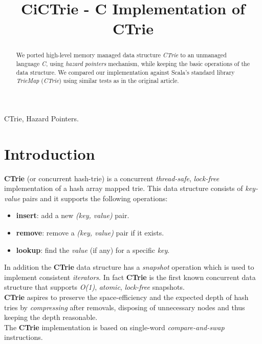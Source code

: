 \documentclass[conference]{IEEEtran}
\begin{document}
%
\title{CiCTrie - C Implementation of CTrie}

\author{
\and
{}
}

\maketitle


\begin{abstract}
	We ported high-level memory managed data structure \textit{CTrie} to an unmanaged language \textit{C}, using \textit{hazard pointers} mechanism, while keeping the basic operations of the data structure. We compared our implementation against Scala's standard library \textit{TrieMap} (\textit{CTrie}) using similar tests as in the original article.
\end{abstract}

\begin{IEEEkeywords}
	CTrie, Hazard Pointers.
\end{IEEEkeywords}

\IEEEpeerreviewmaketitle

\section{Introduction}
		\textbf{CTrie}\cite{article}\cite{wiki-ctrie} (or concurrent hash-trie) is a concurrent \textit{thread-safe}, \textit{lock-free} implementation of a hash array mapped trie. This data structure consists of \textit{key-value} pairs and it supports the following operations:
		\begin{itemize}
			\item \textbf{insert}: add a new \textit{(key, value)} pair.
			\item \textbf{remove}: remove a \textit{(key, value)} pair if it exists.
			\item \textbf{lookup}: find the \textit{value} (if any) for a specific \textit{key}. 
		\end{itemize}
		In addition the \textbf{CTrie} data structure has a \textit{snapshot} operation which is used to implement consistent \textit{iterators}. In fact \textbf{CTrie} is the first known concurrent data structure that supports \textit{O(1)}, \textit{atomic}, \textit{lock-free} snapshots.\\
		\textbf{CTrie} aspires to preserve the space-efficiency and the expected depth of hash tries by \textit{compressing} after removals, disposing of unnecessary nodes and thus keeping the depth reasonable.\\
		The \textbf{CTrie} implementation is based on single-word \textit{compare-and-swap} instructions. 
\end{document}
